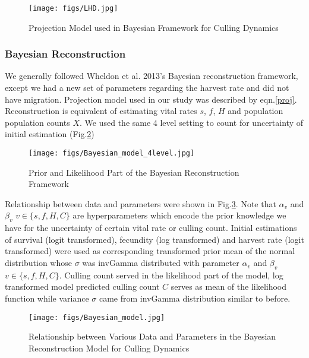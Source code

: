 \documentclass[]{article}
\begin{document}
\begin{figure}[htbp] %
	\centering
	\texttt{[image: figs/LHD.jpg]}
	\caption{Projection Model used in Bayesian Framework for Culling Dynamics}
	\label{Fig.LHD}
\end{figure}

\subsubsection{Bayesian Reconstruction}
We generally followed Wheldon et al. 2013's Bayesian reconstruction framework, except we had a new set of parameters regarding the harvest rate and did not have migration. Projection model used in our study was described by eqn.\ref{proj}. Reconstruction is equivalent of estimating vital rates $s$, $f$, $H$ and population population counts $X$. We used the same 4 level setting to count for uncertainty of initial estimation (Fig.\ref{Fig.Bayes4level})

\begin{figure}[htbp] %
	\centering
	\texttt{[image: figs/Bayesian\_model\_4level.jpg]}
	\caption{Prior and Likelihood Part of the Bayesian Reconstruction Framework}
	\label{Fig.Bayes4level}
\end{figure}

Relationship between data and parameters were shown in Fig.\ref{Fig.Bayes}. Note that $\alpha_{v}$ and $\beta_{v}$ $v\in\{s,f,H,C\}$ are hyperparameters which encode the prior knowledge we have for the uncertainty of certain vital rate or culling count. Initial estimations of survival (logit transformed), fecundity (log transformed) and harvest rate (logit transformed) were used as corresponding transformed prior mean of the normal distribution whose $\sigma$ was invGamma distributed with parameter $\alpha_{v}$ and $\beta_{v}$ $v\in\{s,f,H,C\}$. Culling count served in the likelihood part of the model, log transformed model predicted culling count $C$ serves as mean of the likelihood function while variance $\sigma$ came from invGamma distribution similar to before. 

\begin{figure}[htbp] %
	\centering
	\texttt{[image: figs/Bayesian\_model.jpg]}
	\caption{Relationship between Various Data and Parameters in the Bayesian Reconstruction Model for Culling Dynamics}
	\label{Fig.Bayes}
\end{figure}
\end{document}
